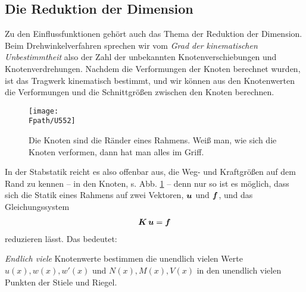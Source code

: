 {\textcolor{chapterTitleBlue}{\section{Die Reduktion der Dimension}}}

Zu den Einflussfunktionen geh\"{o}rt auch das Thema der Reduktion der Dimension.
Beim Drehwinkelverfahren sprechen wir vom {\em Grad der kinematischen Unbestimmtheit\/} also der Zahl der unbekannten Knotenverschiebungen und Knotenverdrehungen. Nachdem die Verformungen der Knoten berechnet wurden, ist das Tragwerk kinematisch bestimmt, und wir k\"{o}nnen aus den Knotenwerten die Verformungen und die Schnittgr\"{o}{\ss}en zwischen den Knoten  berechnen.
\begin{figure}[tbp]
\centering
\if {} \sidecaption \fi
\texttt{[image: \\Fpath/U552]}
\caption{Die Knoten sind die \glq R\"{a}nder\grq{} eines Rahmens. Wei{\ss} man, wie sich die Knoten verformen, dann hat man alles im Griff.} \label{U252}
\end{figure}%

In der Stabstatik reicht es also offenbar aus, die Weg- und Kraftgr\"{o}{\ss}en auf dem \glq Rand\grq{} zu kennen -- in den Knoten, s. Abb. \ref{U252} -- denn nur so ist es m\"{o}glich, dass sich die Statik eines Rahmens auf zwei Vektoren, $\mbox{\boldmath $u$}$ und $\mbox{\boldmath $f$}$, und das Gleichungssystem
\begin{align}
\mbox{\boldmath $K$}\,\mbox{\boldmath $u$} = \mbox{\boldmath $f$}
\end{align}
reduzieren l\"{a}sst. Das bedeutet:\\

\hspace*{-12pt}\colorbox{highlightBlue}{\parbox{0.98\textwidth}{{\em Endlich viele\/} Knotenwerte bestimmen die unendlich vielen Werte $u(x), w(x), w'(x) $ und $ N(x), M(x), V(x)$ in den unendlich vielen Punkten der Stiele und Riegel.}}
\\

